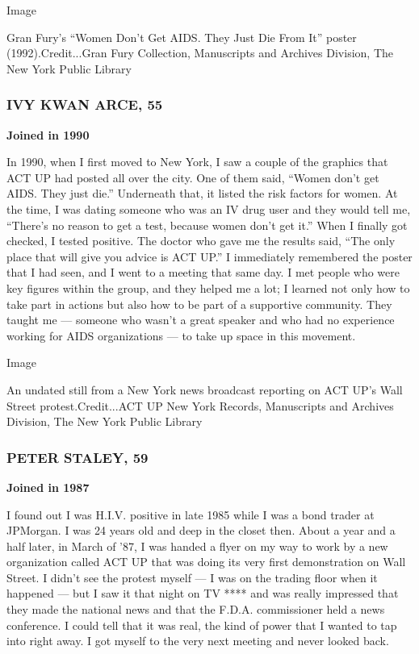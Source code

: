 Image

Gran Fury's ``Women Don't Get AIDS. They Just Die From It'' poster
(1992).Credit...Gran Fury Collection, Manuscripts and Archives Division,
The New York Public Library

\hypertarget{ivy-kwan-arce-55}{%
\subsubsection{IVY KWAN ARCE, 55}\label{ivy-kwan-arce-55}}

\textbf{Joined in 1990}

In 1990, when I first moved to New York, I saw a couple of the graphics
that ACT UP had posted all over the city. One of them said, ``Women
don't get AIDS. They just die.'' Underneath that, it listed the risk
factors for women. At the time, I was dating someone who was an IV drug
user and they would tell me, ``There's no reason to get a test, because
women don't get it.'' When I finally got checked, I tested positive. The
doctor who gave me the results said, ``The only place that will give you
advice is ACT UP.'' I immediately remembered the poster that I had seen,
and I went to a meeting that same day. I met people who were key figures
within the group, and they helped me a lot; I learned not only how to
take part in actions but also how to be part of a supportive community.
They taught me --- someone who wasn't a great speaker and who had no
experience working for AIDS organizations --- to take up space in this
movement.

Image

An undated still from a New York news broadcast reporting on ACT UP's
Wall Street protest.Credit...ACT UP New York Records, Manuscripts and
Archives Division, The New York Public Library

\hypertarget{peter-staley-59}{%
\subsubsection{PETER STALEY, 59}\label{peter-staley-59}}

\textbf{Joined in 1987}

I found out I was H.I.V. positive in late 1985 while I was a bond trader
at JPMorgan. I was 24 years old and deep in the closet then. About a
year and a half later, in March of '87, I was handed a flyer on my way
to work by a new organization called ACT UP that was doing its very
first demonstration on Wall Street. I didn't see the protest myself ---
I was on the trading floor when it happened --- but I saw it that night
on TV **** and was really impressed that they made the national news and
that the F.D.A. commissioner held a news conference. I could tell that
it was real, the kind of power that I wanted to tap into right away. I
got myself to the very next meeting and never looked back.


